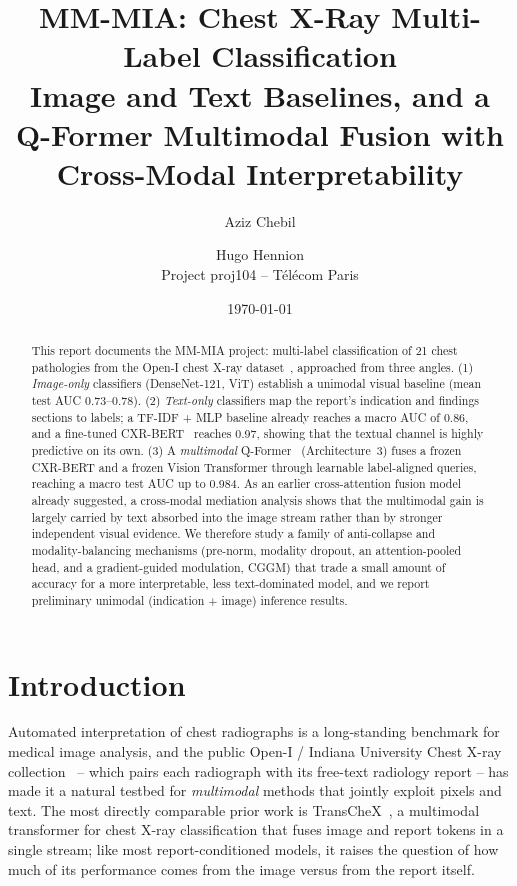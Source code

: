 \documentclass[11pt]{article}
\title{MM-MIA: Chest X-Ray Multi-Label Classification \\
\large Image and Text Baselines, and a Q-Former Multimodal Fusion with Cross-Modal Interpretability}
\author{Aziz Chebil \and Hugo Hennion \\ \small Project proj104 -- T\'el\'ecom Paris}
\date{\today}
\begin{document}
\maketitle

\begin{abstract}
This report documents the MM-MIA project: multi-label classification of 21 chest
pathologies from the Open-I chest X-ray dataset~\cite{openi}, approached from three
angles. (1) \emph{Image-only} classifiers (DenseNet-121, ViT) establish a unimodal
visual baseline (mean test AUC 0.73--0.78). (2) \emph{Text-only} classifiers map the
report's indication and findings sections to labels; a TF-IDF + MLP baseline already
reaches a macro AUC of 0.86, and a fine-tuned CXR-BERT~\cite{cxrbert} reaches 0.97,
showing that the textual channel is highly predictive on its own. (3) A
\emph{multimodal} Q-Former~\cite{blip2} (Architecture~3) fuses a frozen CXR-BERT and a
frozen Vision Transformer through learnable label-aligned queries, reaching a macro
test AUC up to 0.984. As an earlier cross-attention fusion model already suggested,
a cross-modal mediation analysis shows that the multimodal gain is largely carried by
text absorbed into the image stream rather than by stronger independent visual
evidence. We therefore study a family of anti-collapse and modality-balancing
mechanisms (pre-norm, modality dropout, an attention-pooled head, and a
gradient-guided modulation, CGGM) that trade a small amount of accuracy for a more
interpretable, less text-dominated model, and we report preliminary unimodal
(indication + image) inference results.
\end{abstract}

\tableofcontents

\section{Introduction}

Automated interpretation of chest radiographs is a long-standing benchmark for
medical image analysis, and the public Open-I / Indiana University Chest X-ray
collection~\cite{openi} -- which pairs each radiograph with its free-text radiology
report -- has made it a natural testbed for \emph{multimodal} methods that jointly
exploit pixels and text. The most directly comparable prior work is
TransCheX~\cite{transchex}, a multimodal transformer for chest X-ray classification
that fuses image and report tokens in a single stream; like most report-conditioned
models, it raises the question of how much of its performance comes from the image
versus from the report itself.
\end{document}

